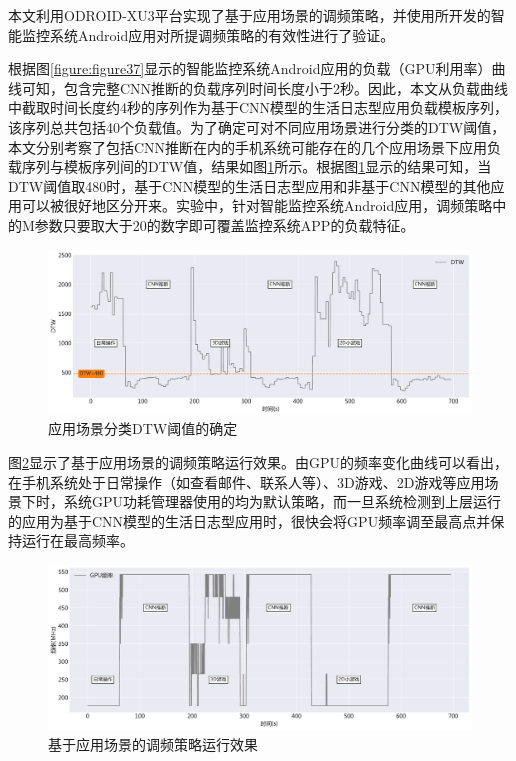 本文利用ODROID-XU3平台实现了基于应用场景的调频策略，并使用所开发的智能监控系统Android应用对所提调频策略的有效性进行了验证。

根据图\ref{figure:figure37}显示的智能监控系统Android应用的负载（GPU利用率）曲线可知，包含完整CNN推断的负载序列时间长度小于2秒。因此，本文从负载曲线中截取时间长度约4秒的序列作为基于CNN模型的生活日志型应用负载模板序列，该序列总共包括40个负载值。为了确定可对不同应用场景进行分类的DTW阈值，本文分别考察了包括CNN推断在内的手机系统可能存在的几个应用场景下应用负载序列与模板序列间的DTW值，结果如图\ref{figure:figure41}所示。根据图\ref{figure:figure41}显示的结果可知，当DTW阈值取480时，基于CNN模型的生活日志型应用和非基于CNN模型的其他应用可以被很好地区分开来。实验中，针对智能监控系统Android应用，调频策略中的M参数只要取大于20的数字即可覆盖监控系统APP的负载特征。

\begin{figure}[htbp]
    \centering
    \includegraphics[width=1.0\textwidth]{figures/system_dtw.pdf}
    \caption{应用场景分类DTW阈值的确定}\label{figure:figure41}
\end{figure}

图\ref{figure:figure42}显示了基于应用场景的调频策略运行效果。由GPU的频率变化曲线可以看出，在手机系统处于日常操作（如查看邮件、联系人等）、3D游戏、2D游戏等应用场景下时，系统GPU功耗管理器使用的均为默认策略，而一旦系统检测到上层运行的应用为基于CNN模型的生活日志型应用时，很快会将GPU频率调至最高点并保持运行在最高频率。

\begin{figure}[htbp]
    \centering
    \includegraphics[width=1.0\textwidth]{figures/system_governor.pdf}
    \caption{基于应用场景的调频策略运行效果}\label{figure:figure42}
\end{figure}

